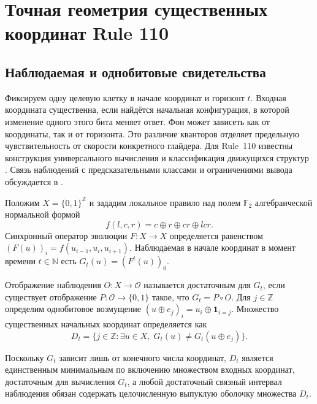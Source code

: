 \section{Точная геометрия существенных координат Rule 110}\label{sec:geometry}
\subsection{Наблюдаемая и однобитовые свидетельства}
Фиксируем одну целевую клетку в начале координат и горизонт $t$. Входная координата существенна, если найдётся начальная конфигурация, в которой изменение одного этого бита меняет ответ. Фон может зависеть как от координаты, так и от горизонта. Это различие кванторов отделяет предельную чувствительность от скорости конкретного глайдера. Для Rule~110 известны конструкция универсального вычисления \cite{cook2004} и классификация движущихся структур \cite{wolfram1986,martinez2006}. Связь наблюдений с предсказательными классами и ограничениями вывода обсуждается в \cite{shalizi2001,wolpert2008}.

\begin{definition}
Положим $X = \{0, 1\}^{\mathbb{Z}}$ и зададим локальное правило над полем $\mathbb{F}_2$ алгебраической нормальной формой
\begin{equation}\label{eq:rule110}
f(l, c, r) = c \oplus r \oplus cr \oplus lcr.
\end{equation}
Синхронный оператор эволюции $F : X \to X$ определяется равенством $(F(u))_i = f(u_{i-1}, u_i, u_{i+1})$. Наблюдаемая в начале координат в момент времени $t \in \mathbb{N}$ есть $G_t(u) = (F^t(u))_0$.
\end{definition}

\begin{definition}
Отображение наблюдения $O : X \to \mathcal{O}$ называется достаточным для $G_t$, если существует отображение $P : \mathcal{O} \to \{0, 1\}$ такое, что $G_t = P \circ O$. Для $j \in \mathbb{Z}$ определим однобитовое возмущение $(u \oplus e_j)_i = u_i \oplus \mathbf{1}_{i=j}$. Множество существенных начальных координат определяется как
\begin{equation}\label{eq:essential_set}
D_t = \{ j \in \mathbb{Z} : \exists u \in X,\; G_t(u) \ne G_t(u \oplus e_j) \}.
\end{equation}
\end{definition}

Поскольку $G_t$ зависит лишь от конечного числа координат, $D_t$ является единственным минимальным по включению множеством входных координат, достаточным для вычисления $G_t$, а любой достаточный связный интервал наблюдения обязан содержать целочисленную выпуклую оболочку множества $D_t$.

